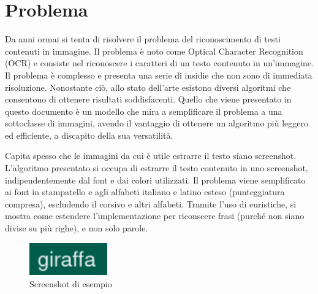 \chapter{Problema}

Da anni ormai si tenta di risolvere il problema del riconoscimento di testi contenuti in immagine. Il problema è noto come Optical Character Recognition (OCR) e consiste nel riconoscere i caratteri di un testo contenuto in un'immagine. Il problema è complesso e presenta una serie di insidie che non sono di immediata risoluzione. Nonostante ciò, allo stato dell'arte esistono diversi algoritmi che consentono di ottenere risultati soddisfacenti.
Quello che viene presentato in questo documento è un modello che mira a semplificare il problema a una sottoclasse di immagini, avendo il vantaggio di ottenere un algoritmo più leggero ed efficiente, a discapito della sua versatilità.

Capita spesso che le immagini da cui è utile estrarre il testo siano screenshot. L'algoritmo presentato si occupa di estrarre il testo contenuto in uno screenshot, indipendentemente dal font e dai colori utilizzati. Il problema viene semplificato ai font in stampatello e agli alfabeti italiano e latino esteso (punteggiatura compresa), escludendo il corsivo e altri alfabeti. Tramite l'uso di euristiche, si mostra come estendere l'implementazione per riconscere frasi (purché non siano divise su più righe), e non solo parole.

\begin{figure}[H]
	\centering
	\includegraphics[width=0.3\textwidth]{images/giraffa.png}
	\caption{Screenshot di esempio}
	\label{fig:screenshot}
\end{figure}
